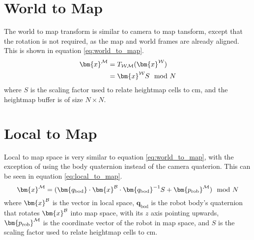     \newpage
    \section{World to Map}
        The world to map transform is similar to camera to map tansform, except that the rotation is not required, as the map and world frames are already aligned.
        This is shown in equation \ref{eq:world_to_map}.
        \begin{align}\label{eq:world_to_map}
        \begin{split}
            \bm{x}\inrefframe{\fmap} &= \transframe{\bm{x}\inrefframe{\fworld}}{\fworld}{\fmap} \\
            &= \bm{x}\inrefframe{\fworld}S \mod{N}
        \end{split}
        \end{align}
        where \(S\) is the scaling factor used to relate heightmap cells to cm, and the heightmap buffer is of size \(N\times N\).
    \section{Local to Map}
        Local to map space is very similar to equation \ref{eq:world_to_map}, with the exception of using the body quaternion instead of the camera quaterion. This can be seen in
        equation \ref{eq:local_to_map}.
        \begin{equation} \label{eq:local_to_map}
            \bm{x}\inrefframe{\fmap} = (\bm{q_\text{bod}} \cdot \bm{x}\inrefframe{\fbody} \cdot \bm{q_\text{bod}}^{-1}S + \bm{p_\text{rob}}\inrefframe{\fmap}) \mod N
        \end{equation}
        where \(\bm{x}\inrefframe{\fbody}\) is the vector in local space, \(\bm{q}_\text{bod}\) is the robot body's quaternion that rotates \(\bm{x}\inrefframe{\fbody}\) 
        into map space, with its \(z\) axis pointing upwards, \(\bm{p_\text{rob}}\inrefframe{\fmap}\) is the coordinate vector of the robot in map space, and \(S\) is the scaling factor
        used to relate heightmap cells to cm.

